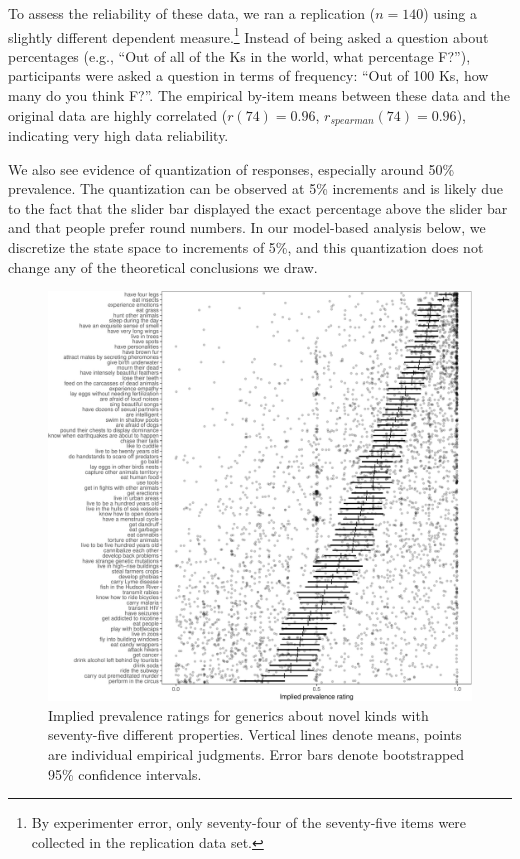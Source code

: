 \documentclass[floatsintext,doc]{apa6}
\let\rmarkdownfootnote\footnote%
\def\footnote{\protect\rmarkdownfootnote}
\begin{document}
To assess the reliability of these data, we ran a replication (\(n=140\)) using a slightly different dependent measure.\footnote{By experimenter error, only seventy-four of the seventy-five items were collected in the replication data set.}
Instead of being asked a question about percentages (e.g., \enquote{Out of all of the Ks in the world, what percentage F?}), participants were asked a question in terms of frequency: \enquote{Out of 100 Ks, how many do you think F?}.
The empirical by-item means between these data and the original data are highly correlated (\(r(74) = 0.96\), \(r_{spearman}(74)= 0.96\)), indicating very high data reliability.

We also see evidence of quantization of responses, especially around 50\% prevalence. The quantization can be observed at 5\% increments and is likely due to the fact that the slider bar displayed the exact percentage above the slider bar and that people prefer round numbers. 
In our model-based analysis below, we discretize the state space to increments of 5\%, and this quantization does not change any of the theoretical conclusions we draw.


\begin{figure}
\centering
\includegraphics{genint_files/figure-latex/genint-empiricalData-1.pdf}
\caption{\label{fig:genint-empiricalData}Implied prevalence ratings for generics about novel kinds with seventy-five different properties. Vertical lines denote means, points are individual empirical judgments. Error bars denote bootstrapped 95\% confidence intervals.}
\end{figure}
\end{document}
